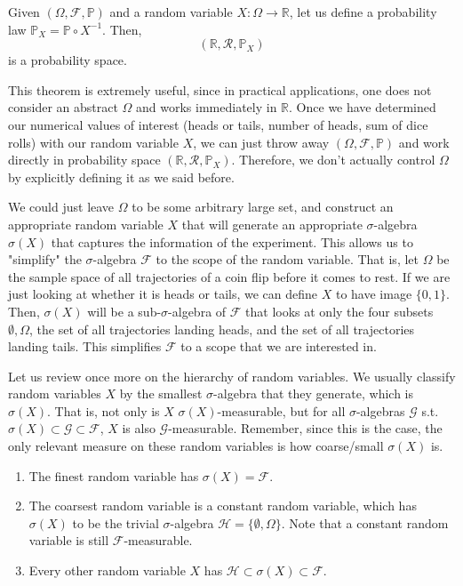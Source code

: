 \documentclass{article}
\begin{document}
    \begin{theorem}
      Given $(\Omega, \mathcal{F}, \mathbb{P})$ and a random variable $X: \Omega \rightarrow \mathbb{R}$, let us define a probability law $\mathbb{P}_X = \mathbb{P} \circ X^{-1}$. Then, 
      \begin{equation}
        (\mathbb{R}, \mathcal{R}, \mathbb{P}_X)
      \end{equation}
      is a probability space. 
    \end{theorem}

    This theorem is extremely useful, since in practical applications, one does not consider an abstract $\Omega$ and works immediately in $\mathbb{R}$. Once we have determined our numerical values of interest (heads or tails, number of heads, sum of dice rolls) with our random variable $X$, we can just throw away $(\Omega, \mathcal{F}, \mathbb{P})$ and work directly in probability space $(\mathbb{R}, \mathcal{R}, \mathbb{P}_X)$. Therefore, we don't actually control $\Omega$ by explicitly defining it as we said before. 

    We could just leave $\Omega$ to be some arbitrary large set, and construct an appropriate random variable $X$ that will generate an appropriate $\sigma$-algebra $\sigma(X)$ that captures the information of the experiment. This allows us to "simplify" the $\sigma$-algebra $\mathcal{F}$ to the scope of the random variable. That is, let $\Omega$ be the sample space of all trajectories of a coin flip before it comes to rest. If we are just looking at whether it is heads or tails, we can define $X$ to have image $\{0, 1\}$. Then, $\sigma(X)$ will be a sub-$\sigma$-algebra of $\mathcal{F}$ that looks at only the four subsets $\emptyset, \Omega$, the set of all trajectories landing heads, and the set of all trajectories landing tails. This simplifies $\mathcal{F}$ to a scope that we are interested in. 

    Let us review once more on the hierarchy of random variables. We usually classify random variables $X$ by the smallest $\sigma$-algebra that they generate, which is $\sigma(X)$. That is, not only is $X$ $\sigma(X)$-measurable, but for all $\sigma$-algebras $\mathcal{G}$ s.t. $\sigma(X) \subset \mathcal{G} \subset \mathcal{F}$, $X$ is also $\mathcal{G}$-measurable. Remember, since this is the case, the only relevant measure on these random variables is how coarse/small $\sigma(X)$ is. 
    \begin{enumerate}
      \item The finest random variable has $\sigma(X) = \mathcal{F}$. 
      
      \item The coarsest random variable is a constant random variable, which has $\sigma(X)$ to be the trivial $\sigma$-algebra $\mathcal{H} = \{\emptyset, \Omega\}$. Note that a constant random variable is still $\mathcal{F}$-measurable. 
      
      \item Every other random variable $X$ has $\mathcal{H} \subset \sigma(X) \subset \mathcal{F}$. 
    \end{enumerate}
\end{document}

